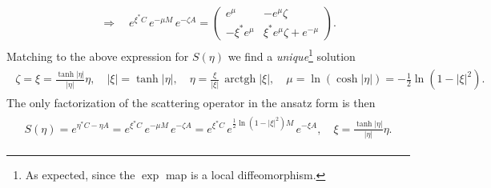 \documentclass[../QFT_main.tex]{subfiles}
\begin{document}
\begin{mytheorem}
{\begin{align}
\begin{aligned}
    &\quad\Rightarrow\quad e^{\xi^* C}\,e^{-\mu M}\,e^{-\zeta A}=
    \begin{pmatrix}e^\mu & -e^\mu\zeta\\-\xi^* e^\mu & \xi^* e^\mu\zeta + e^{-\mu}\end{pmatrix}.
\end{aligned}\end{align}}
Matching to the above expression for $S(\eta)$ we find a \emph{unique}\footnote{As expected, since the $\exp$ map is a local diffeomorphism.} solution
{\small\begin{align}
\begin{aligned}
    \zeta=\xi=\frac{\tanh|\eta|}{|\eta|}\eta,\quad |\xi|=\tanh|\eta|,\quad\eta = \frac{\xi}{|\xi|}\,\operatorname{arctgh}|\xi|,\quad \mu=\ln(\cosh|\eta|)=-\tfrac12\ln(1-|\xi|^2).
\end{aligned}\end{align}}
The only factorization of the scattering operator in the ansatz form is then
\begin{align}
\begin{aligned}
    S(\eta)=e^{\eta^*C-\eta A}=e^{\xi^* C}\,e^{-\mu M}\,e^{-\zeta A} = e^{\xi^* C}\,e^{\frac12\ln(1-|\xi|^2)M}\,e^{-\xi A}, \quad \xi=\tfrac{\tanh|\eta|}{|\eta|}\eta.
\end{aligned}\end{align}
%
\end{mytheorem}
\end{document}
